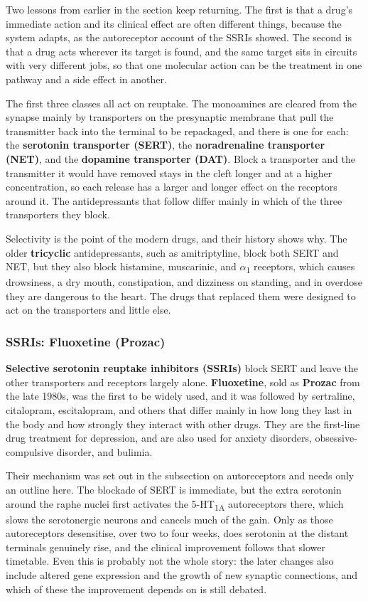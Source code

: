 \documentclass[11pt]{article}
\begin{document}
Two lessons from earlier in the section keep returning. The first is that a drug's immediate action and its clinical effect are often different things, because the system adapts, as the autoreceptor account of the SSRIs showed. The second is that a drug acts wherever its target is found, and the same target sits in circuits with very different jobs, so that one molecular action can be the treatment in one pathway and a side effect in another.

The first three classes all act on reuptake. The monoamines are cleared from the synapse mainly by transporters on the presynaptic membrane that pull the transmitter back into the terminal to be repackaged, and there is one for each: the \textbf{serotonin transporter (SERT)}, the \textbf{noradrenaline transporter (NET)}, and the \textbf{dopamine transporter (DAT)}. Block a transporter and the transmitter it would have removed stays in the cleft longer and at a higher concentration, so each release has a larger and longer effect on the receptors around it. The antidepressants that follow differ mainly in which of the three transporters they block.

Selectivity is the point of the modern drugs, and their history shows why. The older \textbf{tricyclic} antidepressants, such as amitriptyline, block both SERT and NET, but they also block histamine, muscarinic, and $\alpha$\textsubscript{1} receptors, which causes drowsiness, a dry mouth, constipation, and dizziness on standing, and in overdose they are dangerous to the heart. The drugs that replaced them were designed to act on the transporters and little else.

\subsubsection{SSRIs: Fluoxetine (Prozac)}

\textbf{Selective serotonin reuptake inhibitors (SSRIs)} block SERT and leave the other transporters and receptors largely alone. \textbf{Fluoxetine}, sold as \textbf{Prozac} from the late 1980s, was the first to be widely used, and it was followed by sertraline, citalopram, escitalopram, and others that differ mainly in how long they last in the body and how strongly they interact with other drugs. They are the first-line drug treatment for depression, and are also used for anxiety disorders, obsessive-compulsive disorder, and bulimia.

Their mechanism was set out in the subsection on autoreceptors and needs only an outline here. The blockade of SERT is immediate, but the extra serotonin around the raphe nuclei first activates the 5-HT\textsubscript{1A} autoreceptors there, which slows the serotonergic neurons and cancels much of the gain. Only as those autoreceptors desensitise, over two to four weeks, does serotonin at the distant terminals genuinely rise, and the clinical improvement follows that slower timetable. Even this is probably not the whole story: the later changes also include altered gene expression and the growth of new synaptic connections, and which of these the improvement depends on is still debated.
\end{document}
